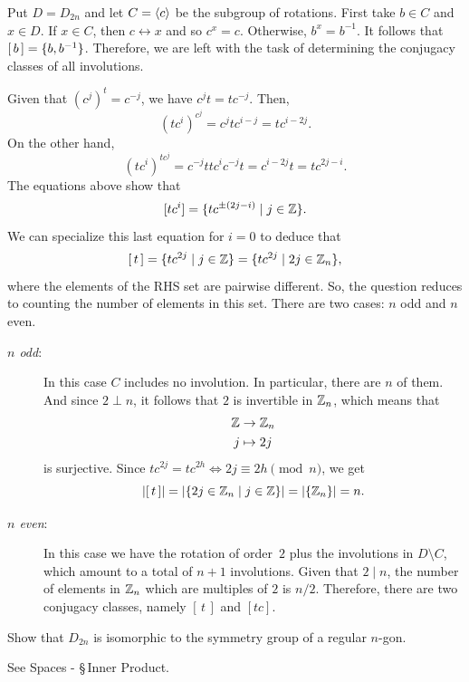 \begin{solution} Put $D=D_{2n}$ and let $C=\langle c\rangle$ be the subgroup of rotations. First take $b\in C$ and $x\in D$. If $x\in C$, then $c\leftrightarrow x$ and so $c^x=c$. Otherwise, $b^x=b^{-1}$. It follows that $[\,b\,]=\{b,b^{-1}\}$. Therefore, we are left with the task of determining the conjugacy classes of all involutions.

Given that $(c^j)^t=c^{-j}$, we have $c^jt=tc^{-j}$. Then, 
$$
    (tc^i)^{c^j} = c^jtc^{i-j}=tc^{i-2j}.
$$
On the other hand,
$$
    (tc^i)^{tc^j} = c^{-j}ttc^ic^{-j}t = c^{i-2j}t=tc^{2j-i}.
$$
 The equations above show that
$$
    [tc^i]=\{tc^{\pm(2j-i)}\mid j\in\mathbb{Z}\}.
$$
We can specialize this last equation for $i=0$ to deduce that
\begin{equation}\label{eq3}
    [\,t\,]=\{tc^{2j}\mid j\in\mathbb{Z}\} = \{tc^{2j}\mid 2j\in\mathbb{Z}_n\},
\end{equation}
where the elements of the RHS set are pairwise different. So, the question reduces to counting the number of elements in this set. There are two cases: $n$ odd and $n$ even.
\begin{description}
    \item[\textit{$n$ odd\/}:] In this case $C$ includes no involution. In particular, there are $n$ of them. And since $2\perp n$, it follows that $2$ is invertible in $\mathbb{Z}_n$, which means that
    \begin{align*}
        \mathbb{Z}&\to\mathbb{Z}_n\\
        j&\mapsto 2j
    \end{align*}
    is surjective. Since $tc^{2j}=tc^{2h}\iff 2j\equiv2h\pmod n$, we get
    $$
        |[\,t\,]|=|\{2j\in\mathbb{Z}_n\mid j\in\mathbb{Z}\}|=|\{\mathbb{Z}_n\}|=n.
    $$
    \item[\textit{$n$ even\/}:] In this case we have the rotation of order~$2$ plus the involutions in $D\setminus C$, which amount to a total of $n+1$ involutions. Given that $2\mid n$, the number of elements in $\mathbb{Z}_n$ which are multiples of $2$ is $n/2$. Therefore, there are two conjugacy classes, namely $[\,t\,]$ and $[tc]$.
\end{description}
\end{solution}

\begin{probl}
    Show that $D_{2n}$ is isomorphic to the symmetry group of a regular $n$-gon.
\end{probl}

\begin{solution} See Spaces - \S\,Inner Product.\end{solution}

